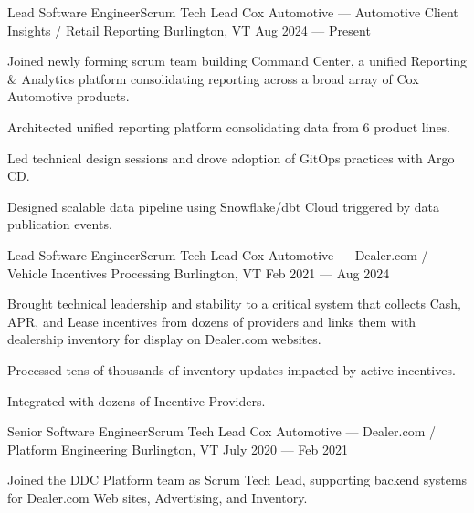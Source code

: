\begin{cventries}
  \cventry
    {Lead Software Engineer{\enskip\cdotp\enskip}Scrum Tech Lead} %
    {Cox Automotive --- Automotive Client Insights / Retail Reporting} %
    {Burlington, VT} %
    {Aug 2024 --- Present} %
    {%
      \begin{cvitems}
        \item {Joined newly forming scrum team building Command Center, a unified Reporting \& Analytics platform consolidating reporting across a broad array of Cox Automotive products.}
        \item {Architected unified reporting platform consolidating data from 6 product lines.}
        \item {Led technical design sessions and drove adoption of GitOps practices with Argo CD.}
        \item {Designed scalable data pipeline using Snowflake/dbt Cloud triggered by data publication events.}
      \end{cvitems}
    }

  \cventry
    {Lead Software Engineer{\enskip\cdotp\enskip}Scrum Tech Lead} %
    {Cox Automotive --- Dealer.com / Vehicle Incentives Processing} %
    {Burlington, VT} %
    {Feb 2021 --- Aug 2024} %
    {%
      \begin{cvitems}
        \item {Brought technical leadership and stability to a critical system that collects Cash, APR, and Lease incentives from dozens of providers and links them with dealership inventory for display on Dealer.com websites.}
        \item {Processed tens of thousands of inventory updates impacted by active incentives.}
        \item {Integrated with dozens of Incentive Providers.}
      \end{cvitems}
    }

  \cventry
    {Senior Software Engineer{\enskip\cdotp\enskip}Scrum Tech Lead} %
    {Cox Automotive --- Dealer.com / Platform Engineering} %
    {Burlington, VT} %
    {July 2020 --- Feb 2021} %
    {%
      \begin{cvitems}
        \item {Joined the DDC Platform team as Scrum Tech Lead, supporting backend systems for Dealer.com Web sites, Advertising, and Inventory.}
      \end{cvitems}
    }


\end{cventries}
